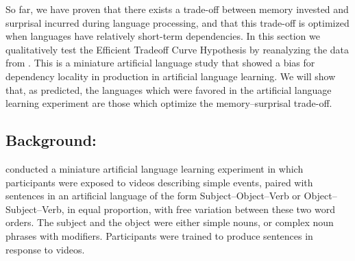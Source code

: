 So far, we have proven that there exists a trade-off between memory invested and surprisal incurred during language processing, and that this trade-off is optimized when languages have relatively short-term dependencies. In this section we qualitatively test the Efficient Tradeoff Curve Hypothesis by reanalyzing the data from \cite{fedzechkina-human-2017}.
This is a miniature artificial language study that showed a bias for dependency locality in production in artificial language learning. 
We will show that, as predicted, the languages which were favored in the artificial language learning experiment are those which optimize the memory--surprisal trade-off. 

\subsection{Background: \citet{fedzechkina-human-2017}}

\citet{fedzechkina-human-2017} conducted a miniature artificial language learning experiment in which participants were exposed to videos describing simple events, paired with sentences in an artificial language of the form Subject--Object--Verb or Object--Subject--Verb, in equal proportion, with free variation between these two word orders. The subject and the object were either simple nouns, or complex noun phrases with modifiers. Participants were trained to produce sentences in response to videos.

